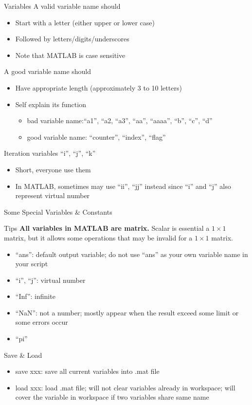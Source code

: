 \begin{frame}{Variables}
A valid variable name should
\begin{itemize}
\item Start with a letter (either upper or lower case)
\item Followed by letters/digits/underscores
\item Note that MATLAB is case sensitive
\end{itemize}
A good variable name should\footnotemark
\begin{itemize}
\item Have appropriate length (approximately 3 to 10 letters)
\item Self explain its function
\begin{itemize}
\item bad variable name:``a1'', ``a2, ``a3'', ``aa'', ``aaaa'', ``b'', ``c'', ``d''
\item good variable name: ``counter'', ``index'', ``flag''
\end{itemize}
\end{itemize}
Iteration variables ``i'', ``j'', ``k''
\begin{itemize}
\item Short, everyone use them
\item In MATLAB, sometimes may use ``ii'', ``jj'' instead since ``i'' and ``j'' also represent virtual number
\end{itemize}
\end{frame}

\begin{frame}{Some Special Variables \& Constants}
\begin{block}{Tips}
\textbf{All variables in MATLAB are matrix.} Scalar is essential a $1\times1$ matrix, but it allows some operations that may be invalid for a $1\times1$ matrix.
\end{block}
\begin{itemize}
\item ``ans'': default output variable; do not use ``ans'' as your own variable name in your script
\item ``i'', ``j'': virtual number
\item ``Inf'': infinite
\item ``NaN'': not a number; mostly appear when the result exceed some limit or some errors occur
\item ``pi''
\end{itemize}

\begin{block}{Save \& Load}
\begin{itemize}
\item save xxx: save all current variables into .mat file
\item load xxx: load .mat file; will not clear variables already in workspace; will cover the variable in workspace if two variables share same name
\end{itemize}
\end{block}
\end{frame}

